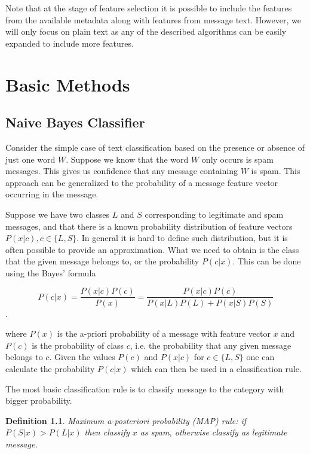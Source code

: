 \documentclass[12pt]{report}
\newtheorem{definition}{Definition}[section]
\begin{document}
Note that at the stage of feature selection it is possible to include the features from the available metadata along with features from message text. However, we will only focus on plain text as any of the described algorithms can be easily expanded to include more features.

\newpage


\chapter{Basic Methods}

\section{Naive Bayes Classifier}

Consider the simple case of text classification based on the presence or absence of just one word $W$. Suppose we know that the word $W$ only occurs is spam messages. This gives us confidence that any message containing $W$ is spam. This approach can be generalized to the probability of a message feature vector occurring in the message.

Suppose we have two classes $L$ and $S$ corresponding to legitimate and spam messages, and that there is a known probability distribution of feature vectors $P(x | c), c \in \{L, S\}$. In general it is hard to define such distribution, but it is often possible to provide an approximation. What we need to obtain is the class that the given message belongs to, or the probability $P(c | x)$. This can be done using the Bayes' formula

$$P(c | x) = \dfrac{P(x | c) P(c)}{P(x)} = \dfrac{P(x | c) P(c)}{P(x | L) P(L) + P(x | S) P(S)}$$.

where $P(x)$ is the a-priori probability of a message with feature vector $x$ and $P(c)$ is the probability of class $c$, i.e. the probability that any given message belongs to $c$. Given the values $P(c)$ and $P(x | c)$ for $c \in \{L, S\}$ one can calculate the probability $P(c | x)$ which can then be used in a classification rule.

The most basic classification rule is to classify message to the category with bigger probability.

\begin{definition}
	Maximum a-posteriori probability (MAP) rule: if $P(S | x) > P(L | x)$ then classify $x$ as spam, otherwise classify as legitimate message.
\end{definition}
\end{document}
